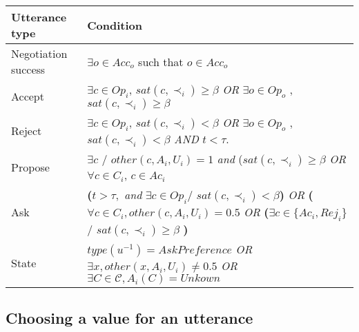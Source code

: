\documentclass{article}
\begin{document}
	\begin{tabular}{|p{3cm}|p{9cm}|}
		\hline
		\textbf{Utterance type} & Condition \\
		\hline
		Negotiation success &  $\exists o \in Acc_o$ such that $o \in Acc_o$ \\
		\hline
		Accept & $\exists c \in Op_i$, $sat(c, \prec_i) \geq \beta$ \newline \emph{OR}   \newline $ \exists o \in Op_o$ ,  $sat(c, \prec_i) \geq \beta$ \\
		\hline
		Reject & $\exists c \in Op_i$, $sat(c, \prec_i) < \beta$  \emph{OR}   $ \exists o \in Op_o$ ,  $sat(c, \prec_i) < \beta$ \newline  \emph{AND} $t<\tau$.\\
		\hline
		Propose & $\exists c$ / $other(c, A_i, U_i)  = 1 $  \emph{and}
		\newline ($sat(c, \prec_i) \geq \beta$
		\newline \emph{OR}  
		\newline $\forall c \in C_i$,  $c \in Ac_i$\\
		\hline
		Ask &  \textbf{(}$t> \tau,$ \emph{and} 
		$\exists c \in Op_i /$
		 $ sat(c, \prec_i) < \beta $\textbf{) }
		\newline \emph{OR}
		\newline \textbf{(}$ \forall c \in C_i,other(c, A_i, U_i)=0.5$
		\newline \emph{OR} 
		\newline \textbf{(}$\exists c \in \{Ac_i, Rej_i\}$ / 
		$sat(c, \prec_i) \geq \beta$ \textbf{)} \\
		\hline
		
		State & $type(u^{-1}) = AskPreference$
		\newline \emph{OR}
		\newline $\exists x,other(x, A_i, U_i) \not = 0.5 $ 
		\newline \emph{OR}
		\newline $ \exists C \in \mathcal{C}, A_i(C) = Unkown$
		\\
		\hline
	\end{tabular}
	

	\subsection{Choosing a value for an utterance}
	
	
	
\end{document}
